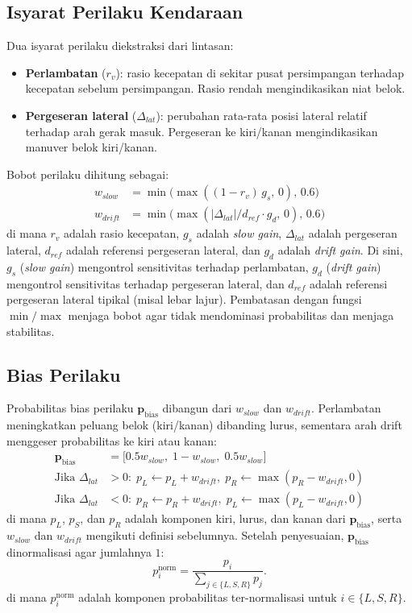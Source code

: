\documentclass[conference]{IEEEtran}
\begin{document}
\subsection{Isyarat Perilaku Kendaraan}
Dua isyarat perilaku diekstraksi dari lintasan:
\begin{itemize}
\item \textbf{Perlambatan} ($r_v$): rasio kecepatan di sekitar pusat persimpangan terhadap kecepatan sebelum persimpangan. Rasio rendah mengindikasikan niat belok.
\item \textbf{Pergeseran lateral} ($\Delta_{lat}$): perubahan rata-rata posisi lateral relatif terhadap arah gerak masuk. Pergeseran ke kiri/kanan mengindikasikan manuver belok kiri/kanan.
\end{itemize}
Bobot perilaku dihitung sebagai:
\begin{align}
 w_{slow} &= \min\big(\max((1-r_v)\,g_s,\,0),\,0.6\big) \\
 w_{drift} &= \min\big(\max(|\Delta_{lat}|/d_{ref}\cdot g_d,\,0),\,0.6\big)
\end{align}
di mana $r_v$ adalah rasio kecepatan, $g_s$ adalah \textit{slow gain}, $\Delta_{lat}$ adalah pergeseran lateral, $d_{ref}$ adalah referensi pergeseran lateral, dan $g_d$ adalah \textit{drift gain}.
Di sini, $g_s$ (\textit{slow gain}) mengontrol sensitivitas terhadap perlambatan, $g_d$ (\textit{drift gain}) mengontrol sensitivitas terhadap pergeseran lateral, dan $d_{ref}$ adalah referensi pergeseran lateral tipikal (misal lebar lajur). Pembatasan dengan fungsi $\min/\max$ menjaga bobot agar tidak mendominasi probabilitas dan menjaga stabilitas.

\subsection{Bias Perilaku}
Probabilitas bias perilaku $\mathbf{p}_{\text{bias}}$ dibangun dari $w_{slow}$ dan $w_{drift}$. Perlambatan meningkatkan peluang belok (kiri/kanan) dibanding lurus, sementara arah drift menggeser probabilitas ke kiri atau kanan:
\begin{align}
\mathbf{p}_{\text{bias}} &= \big[0.5w_{slow},\;1-w_{slow},\;0.5w_{slow}\big] \\
\text{Jika } \Delta_{lat} &> 0:\; p_L \leftarrow p_L + w_{drift},\; p_R \leftarrow \max(p_R-w_{drift},0) \\
\text{Jika } \Delta_{lat} &< 0:\; p_R \leftarrow p_R + w_{drift},\; p_L \leftarrow \max(p_L-w_{drift},0)
\end{align}
di mana $p_L$, $p_S$, dan $p_R$ adalah komponen kiri, lurus, dan kanan dari $\mathbf{p}_{\text{bias}}$, serta $w_{slow}$ dan $w_{drift}$ mengikuti definisi sebelumnya.
Setelah penyesuaian, $\mathbf{p}_{\text{bias}}$ dinormalisasi agar jumlahnya $1$:
\begin{equation}
p_i^{\text{norm}} = \frac{p_i}{\sum_{j \in \{L,S,R\}} p_j}.
\end{equation}
di mana $p_i^{\text{norm}}$ adalah komponen probabilitas ter-normalisasi untuk $i \in \{L,S,R\}$.
\end{document}
